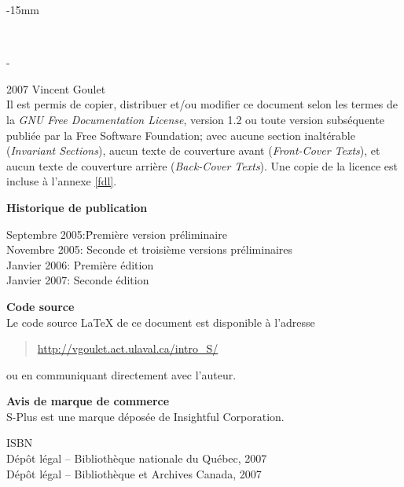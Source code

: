 \cleardoublepage

\begin{adjustwidth*}{\gauche}{-15mm}
  \sffamily
  \raggedright
  \vspace*{2cm}
  \bfseries
  \vspace*{3cm}
  \theauthor \\
  \vspace*{\fill}
  \thedate
\end{adjustwidth*}
\clearpage

\begingroup
\begin{adjustwidth*}{\unitlength}{-\unitlength}
  \footnotesize
  \setlength{\parindent}{0pt}
  \setlength{\parskip}{\baselineskip}

  {\textcopyright} 2007 Vincent Goulet \\

  Il est permis de copier, distribuer et/ou modifier ce document selon
  les termes de la \emph{GNU Free Documentation License}, version 1.2
  ou toute version subséquente publiée par la Free Software
  Foundation; avec aucune section inaltérable (\emph{Invariant
    Sections}), aucun texte de couverture avant (\emph{Front-Cover
    Texts}), et aucun texte de couverture arrière (\emph{Back-Cover
    Texts}). Une copie de la licence est incluse à l'annexe
  \ref{fdl}.

  \textbf{Historique de publication} \\
  \begin{tabbing}
    Septembre 2005:\quad\= Première version préliminaire \\
    Novembre 2005:      \> Seconde et troisième versions préliminaires \\
    Janvier 2006:       \> Première édition \\
    Janvier 2007:       \> Seconde édition \\
  \end{tabbing}

  \textbf{Code source} \\
  Le code source {\LaTeX} de ce document est disponible à l'adresse
  \begin{quote}
    \url{http://vgoulet.act.ulaval.ca/intro_S/}
  \end{quote}
  ou en communiquant directement avec l'auteur.

  \textbf{Avis de marque de commerce} \\
  S-Plus{\textregistered} est une marque déposée de Insightful
  Corporation.

  \vspace{1cm}

  ISBN \ISBN \\
  Dépôt légal -- Bibliothèque nationale du Québec, 2007 \\
  Dépôt légal -- Bibliothèque et Archives Canada, 2007
\end{adjustwidth*}
\endgroup

\rmfamily

\clearpage

